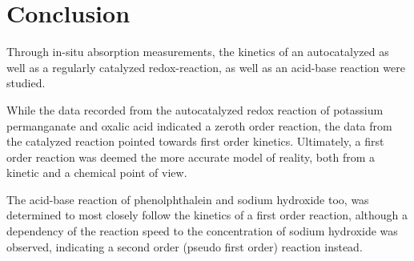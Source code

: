 \documentclass[titlepage]{article}
\begin{document}
\section{Conclusion}
Through in-situ absorption measurements, the kinetics of an autocatalyzed as well as a regularly catalyzed redox-reaction, as well as an acid-base reaction were studied.

While the data recorded from the autocatalyzed redox reaction of potassium permanganate and oxalic acid indicated a zeroth order reaction, the data from the catalyzed reaction pointed towards first order kinetics. Ultimately, a first order reaction was deemed the more accurate model of reality, both from a kinetic and a chemical point of view.

The acid-base reaction of phenolphthalein and sodium hydroxide too, was determined to most closely follow the kinetics of a first order reaction, although a dependency of the reaction speed to the concentration of sodium hydroxide was observed, indicating a second order (pseudo first order) reaction instead.

\appendix
\appendixpage
\end{document}
